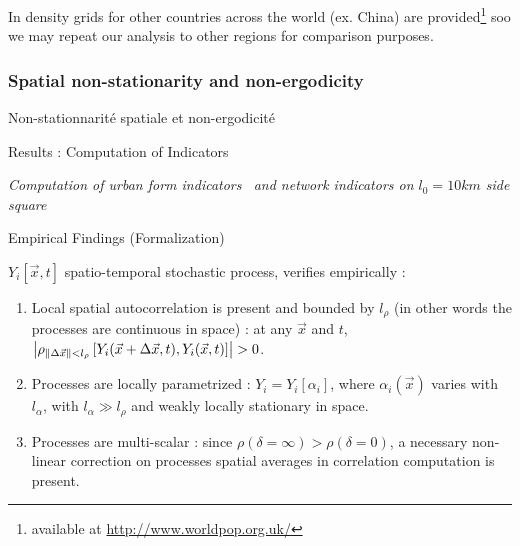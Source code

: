 In \cite{10.1371/journal.pone.0107042} density grids for other countries across the world (ex. China) are provided\footnote{available at \url{http://www.worldpop.org.uk/}} soo we may repeat our analysis to other regions for comparison purposes. 









\subsubsection{Spatial non-stationarity and non-ergodicity}{Non-stationnarité spatiale et non-ergodicité}









Results : Computation of Indicators


\textit{Computation of urban form indicators~\cite{le2015forme} and network indicators on $l_0=10km$ side square}









Empirical Findings (Formalization)

$Y_i\left[\vec{x},t\right]$ spatio-temporal stochastic process, verifies empirically :

\bigskip

\begin{enumerate}
\item Local spatial autocorrelation is present and bounded by $l_{\rho}$ (in other words the processes are continuous in space) : at any $\vec{x}$ and $t$, $\left|\rho_{\| \Delta \vec{x} \| < l_{\rho}}\left[Y_i (\vec{x}+\Delta \vec{x},t), Y_i (\vec{x},t) \right]\right| > 0$.
\medskip
\item Processes are locally parametrized : $Y_i = Y_i\left[\alpha_i\right]$, where $\alpha_i (\vec{x})$ varies with $l_{\alpha}$, with $l_{\alpha} \gg l_{\rho}$ and weakly locally stationary in space.
\medskip
\item Processes are multi-scalar : since $\rho(\delta = \infty) > \rho (\delta = 0 )$, a necessary non-linear correction on processes spatial averages in correlation computation is present.
\end{enumerate}



